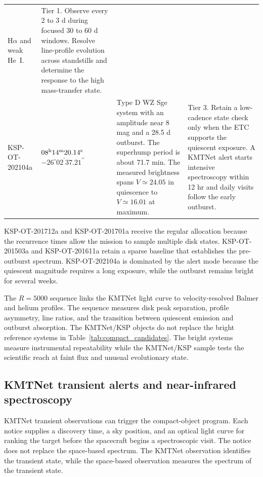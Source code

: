 \documentclass[10pt,onecolumn]{article}
\begin{document}
\begin{table}[H]
\begin{tabularx}{\textwidth}{@{}P{28mm} P{31mm} P{57mm} Y@{}}
H$\alpha$ and weak He~I. &
Tier 1. Observe every 2 to 3 d during focused 30 to 60 d windows. Resolve
line-profile evolution across standstills and determine the response to the
high mass-transfer state.\\
KSP-OT-202104a \cite{kim2026ksp} &
$08^{\rm h}14^{\rm m}20.14^{\rm s}$\newline
$-26^\circ02^\prime37.21^{\prime\prime}$ &
Type D WZ Sge system with an amplitude near 8 mag and a 28.5 d outburst.
The superhump period is about 71.7 min. The measured brightness spans
$V\simeq24.05$ in quiescence to $V\simeq16.01$ at maximum. &
Tier 3. Retain a low-cadence state check only when the ETC supports the
quiescent exposure. A KMTNet alert starts intensive spectroscopy within
12 hr and daily visits follow the early outburst.\\
\bottomrule
\end{tabularx}
\end{table}

KSP-OT-201712a and KSP-OT-201701a receive the regular allocation because the
recurrence times allow the mission to sample multiple disk states.
KSP-OT-201503a and KSP-OT-201611a retain a sparse baseline that establishes
the pre-outburst spectrum. KSP-OT-202104a is dominated by the alert mode
because the quiescent magnitude requires a long exposure, while the outburst
remains bright for several weeks.

The $R=5000$ sequence links the KMTNet light curve to velocity-resolved
Balmer and helium profiles. The sequence measures disk peak separation,
profile asymmetry, line ratios, and the transition between quiescent emission and
outburst absorption. The KMTNet/KSP objects do not replace the bright
reference systems in Table~\ref{tab:compact_candidates}. The bright systems
measure instrumental repeatability while the KMTNet/KSP sample tests the
scientific reach at faint flux and unusual evolutionary state.

\subsection{KMTNet transient alerts and near-infrared spectroscopy}

KMTNet transient observations can trigger the compact-object program. Each
notice supplies a discovery time, a sky position, and an optical light curve
for ranking the target before the spacecraft begins a spectroscopic visit. The
notice does not replace the space-based spectrum. The KMTNet observation
identifies the transient state, while the space-based observation measures the
spectrum of the transient state.
\end{document}
